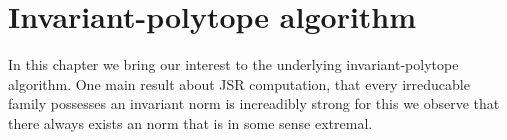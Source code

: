 
\chapter{Invariant-polytope algorithm}
\label{ch:inv.poly}	

In this chapter we bring our interest to the underlying invariant-polytope algorithm. 
One main result about JSR computation, that every irreducable family possesses an invariant norm is increadibly strong for this we observe that there always exists an norm that is in some sense extremal.






